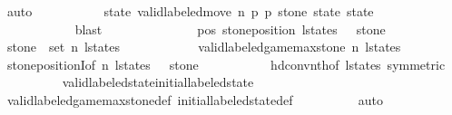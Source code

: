 \begin{isabellebody}
\ auto\isanewline
\isanewline
\ \ \ \ \ \ \ \ \isamarkupfalse%
\ {\isachardoublequoteopen}{\isacharparenleft}{\isasymexists}\ state{\isacharprime}{\isachardot}\ valid{\isacharunderscore}labeled{\isacharunderscore}move{\isacharprime}\ n\ p{}\ p{}\ stone{\isacharprime}\ state\ state{\isacharprime}{\isacharparenright}{\isachardoublequoteclose}\isanewline
\ \ \ \ \ \ \ \ \ \ \isamarkupfalse%
\ {\isacharasterisk}\isanewline
\ \ \ \ \ \ \ \ \ \ \isamarkupfalse%
\ blast\isanewline
\ \ \ \ \ \ \isamarkupfalse%
\isanewline
\isanewline
\ \ \ \ \ \ \isamarkupfalse%
\ pos{}{\isacharcolon}\ {\isachardoublequoteopen}stone{\isacharunderscore}position\ {\isacharparenleft}l{\isacharunderscore}states\ {\isacharbang}\ {}{\isacharparenright}\ stone\ {\isacharequal}\ {}{\isachardoublequoteclose}\isanewline
\ \ \ \ \ \ \ \ \isamarkupfalse%
\ {\isacharbackquoteopen}stone\ {\isasymin}\ set\ {\isacharbrackleft}{}{\isachardot}{\isachardot}{\isacharless}n{\isacharbrackright}{\isacharbackquoteclose}\ {\isacharbackquoteopen}l{\isacharunderscore}states\ {\isasymnoteq}\ {\isacharbrackleft}{\isacharbrackright}{\isacharbackquoteclose}\isanewline
\ \ \ \ \ \ \ \ \isamarkupfalse%
\ {\isacharbackquoteopen}valid{\isacharunderscore}labeled{\isacharunderscore}game{\isacharunderscore}max{\isacharunderscore}stone\ n\ l{\isacharunderscore}states{\isacharbackquoteclose}\isanewline
\ \ \ \ \ \ \ \ \isamarkupfalse%
\ stone{\isacharunderscore}positionI{\isacharbrackleft}of\ n\ {\isachardoublequoteopen}l{\isacharunderscore}states\ {\isacharbang}\ {}{\isachardoublequoteclose}\ stone\ {}{\isacharbrackright}\isanewline
\ \ \ \ \ \ \ \ \isamarkupfalse%
\ hd{\isacharunderscore}conv{\isacharunderscore}nth{\isacharbrackleft}of\ l{\isacharunderscore}states{\isacharcomma}\ symmetric{\isacharbrackright}\isanewline
\ \ \ \ \ \ \ \ \isamarkupfalse%
\ valid{\isacharunderscore}labeled{\isacharunderscore}state{\isacharunderscore}initial{\isacharunderscore}labeled{\isacharunderscore}state\isanewline
\ \ \ \ \ \ \ \ \isamarkupfalse%
\ valid{\isacharunderscore}labeled{\isacharunderscore}game{\isacharunderscore}max{\isacharunderscore}stone{\isacharunderscore}def\ initial{\isacharunderscore}labeled{\isacharunderscore}state{\isacharunderscore}def\isanewline
\ \ \ \ \ \ \ \ \isamarkupfalse%
\ auto\isanewline
\isanewline
\ \ \ \ \ \ \isamarkupfalse%

\end{isabellebody}
